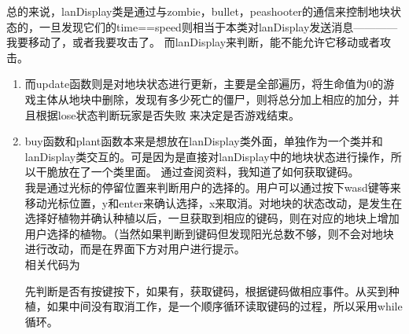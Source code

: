 \documentclass[12pt,a4paper,UTF8]{article}
\begin{document}
    总的来说，lanDisplay类是通过与zombie，bullet，peashooter的通信来控制地块状态的，一旦发现它们的time==speed则相当于本类对lanDisplay发送消息————我要移动了，或者我要攻击了。
    而lanDisplay来判断，能不能允许它移动或者攻击。
    \begin{enumerate}
      \item 而update函数则是对地块状态进行更新，主要是全部遍历，将生命值为0的游戏主体从地块中删除，发现有多少死亡的僵尸，则将总分加上相应的加分，并且根据lose状态判断玩家是否失败
      来决定是否游戏结束。
      \item buy函数和plant函数本来是想放在lanDisplay类外面，单独作为一个类并和lanDisplay类交互的。可是因为是直接对lanDisplay中的地块状态进行操作，所以干脆放在了一个类里面。
      通过查阅资料，我知道了如何获取键码。\\
      我是通过光标的停留位置来判断用户的选择的。用户可以通过按下wasd键等来移动光标位置，y和enter来确认选择，x来取消。对地块的状态改动，是发生在
      选择好植物并确认种植以后，一旦获取到相应的键码，则在对应的地块上增加用户选择的植物。（当然如果判断到键码但发现阳光总数不够，则不会对地块进行改动，而是在界面下方对用户进行提示。\\
      相关代码为
      
      先判断是否有按键按下，如果有，获取键码，根据键码做相应事件。从买到种植，如果中间没有取消工作，是一个顺序循环读取键码的过程，所以采用while循环。
    \end{enumerate}

  
    
\end{document}
